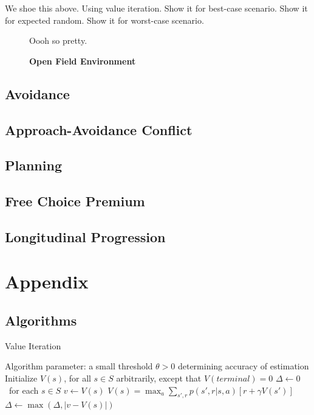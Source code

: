 \documentclass[11pt]{article} %
\begin{document}
We shoe this above. Using value iteration. Show it for best-case scenario. Show
it for expected random. Show it for worst-case scenario.

\begin{figure}
  \centerline{%
  }
  \caption{\textbf{Open Field Environment}}
  \par Oooh so pretty.
\end{figure}

\subsection{Avoidance}

\subsection{Approach-Avoidance Conflict}

\subsection{Planning}

\subsection{Free Choice Premium}

\subsection{Longitudinal Progression}


\section{Appendix}
\subsection{Algorithms}

\begin{algorithm}
  \caption{Value Iteration}

  \State Algorithm parameter: a small threshold $\theta > 0$ determining accuracy of estimation
  \State Initialize $V(s)$, for all $s \in S$ arbitrarily, except that $V(terminal) = 0$
  \State
  \While{$\Delta > \theta$}
    \State $\Delta \leftarrow 0$
    \Loop \ for each $s \in S$
      \State $v \leftarrow V(s)$
      \State $ V(s) = \max_a \sum_{s',r} p(s',r|s,a) \left[ r + \gamma V(s') \right] $
      \State $\Delta \leftarrow \max(\Delta, |v - V(s)|)$
    \EndLoop
  \EndWhile

\end{algorithm}
\end{document}
